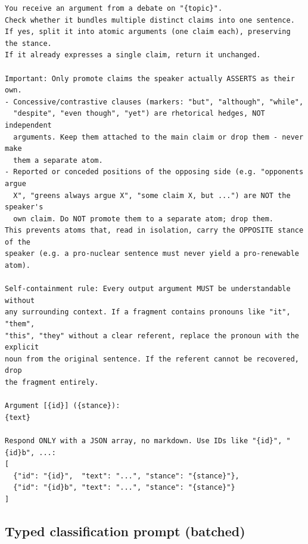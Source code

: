 \begin{lstlisting}[breaklines=true, basicstyle=\ttfamily\footnotesize]
You receive an argument from a debate on "{topic}".
Check whether it bundles multiple distinct claims into one sentence.
If yes, split it into atomic arguments (one claim each), preserving the stance.
If it already expresses a single claim, return it unchanged.

Important: Only promote claims the speaker actually ASSERTS as their own.
- Concessive/contrastive clauses (markers: "but", "although", "while",
  "despite", "even though", "yet") are rhetorical hedges, NOT independent
  arguments. Keep them attached to the main claim or drop them - never make
  them a separate atom.
- Reported or conceded positions of the opposing side (e.g. "opponents argue
  X", "greens always argue X", "some claim X, but ...") are NOT the speaker's
  own claim. Do NOT promote them to a separate atom; drop them.
This prevents atoms that, read in isolation, carry the OPPOSITE stance of the
speaker (e.g. a pro-nuclear sentence must never yield a pro-renewable atom).

Self-containment rule: Every output argument MUST be understandable without
any surrounding context. If a fragment contains pronouns like "it", "them",
"this", "they" without a clear referent, replace the pronoun with the explicit
noun from the original sentence. If the referent cannot be recovered, drop
the fragment entirely.

Argument [{id}] ({stance}):
{text}

Respond ONLY with a JSON array, no markdown. Use IDs like "{id}", "{id}b", ...:
[
  {"id": "{id}",  "text": "...", "stance": "{stance}"},
  {"id": "{id}b", "text": "...", "stance": "{stance}"}
]
\end{lstlisting}

\subsection*{Typed classification prompt (batched)}

